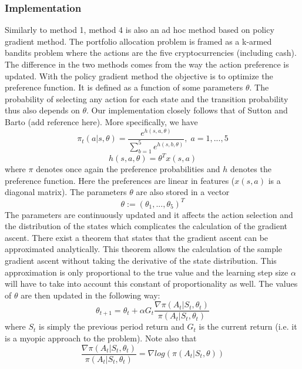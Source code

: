 \documentclass[a4paper,12pt]{article}
\begin{document}
\subsubsection{Implementation}
Similarly to method 1, method 4 is also an ad hoc method based on policy gradient method. The portfolio allocation problem is framed as a k-armed bandits problem where the actions are the five cryptocurrencies (including cash). The difference in the two methods comes from the way the action preference is updated.  With the policy gradient method the objective is to optimize the preference function. It is defined as a function of some parameters $\theta$. The probability of selecting any action for each state and the transition probability thus also depends on $\theta$. Our implementation closely follows that of Sutton and Barto (add reference here). More specifically, we have
\begin{equation}
\pi_t (a|s,\theta)  = \frac{e^{h(s,a,\theta)}}{\sum_{b=1}^{5} e^{h(s,b,\theta)}}, \; a=1,...,5
\end{equation}
\begin{equation}
h(s,a,\theta) = \theta^T x(s,a)
\end{equation}
where $\pi$ denotes once again the preference probabilities and $h$ denotes the preference function. Here the preferences are linear in features ($x(s,a)$ is a diagonal matrix). The parameters $\theta$ are also stored in a vector
\begin{equation}
\theta := (\theta_1,...,\theta_5)^T
\end{equation}
The parameters are continuously updated and it affects the action selection and the distribution of the states which complicates the calculation of the gradient ascent. There exist a theorem that states that the gradient ascent can be approximated analytically. This theorem allows the calculation of the sample gradient ascent without taking the derivative of the state distribution. This approximation is only proportional to the true value and the learning step size $\alpha$ will have to take into account this constant of proportionality as well. The values of $\theta$ are then updated in the following way:
\begin{equation}
\theta_{t+1} = \theta_t + \alpha G_t \frac{\nabla \pi(A_t | S_t,\theta_t)}{\pi(A_t | S_t,\theta_t)}
\end{equation}
where $S_t$ is simply the previous period return and $G_t$ is the current return (i.e. it is a myopic approach to the problem). Note also that 
\begin{equation}
\frac{\nabla \pi(A_t | S_t,\theta_t)}{\pi(A_t | S_t,\theta_t)} = \nabla log(\pi(A_t|S_t,\theta))
\end{equation} \\
\end{document}
